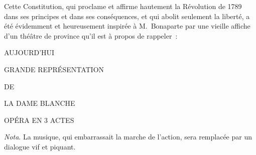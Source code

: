 \documentclass[french,twoside]{book} %
\newenvironment{quoteblock}%
  {\begin{quoting}}
  {\end{quoting}}
\newenvironment{quotebar}{%
    \def\FrameCommand{{\color{rubric!10!}\vrule width 0.5em} \hspace{0.9em}}%
    \def\OuterFrameSep{\itemsep} %
    \MakeFramed {\advance\hsize-\width \FrameRestore}
  }%
  {%
    \endMakeFramed
  }
\renewenvironment{quoteblock}%
  {%
    \savenotes
    \setstretch{0.9}
    \normalfont
    \begin{quotebar}
  }
  {%
    \end{quotebar}
    \spewnotes
  }
\begin{document}
\noindent Cette Constitution, qui proclame et affirme hautement la Révolution de 1789 dans ses principes et dans ses conséquences, et qui abolit seulement la liberté, a été évidemment et heureusement inspirée à M. Bonaparte par une vieille affiche d’un théâtre de province qu’il est à propos de rappeler :\par

\begin{quoteblock}
 \noindent AUJOURD’HUI\par
 GRANDE REPRÉSENTATION\par
 DE\par
 LA DAME BLANCHE\par
 OPÉRA EN 3 ACTES
 \end{quoteblock}

\noindent \emph{Nota}. La musique, qui embarrassait la marche de l’action, sera remplacée par un dialogue vif et piquant.
\end{document}
